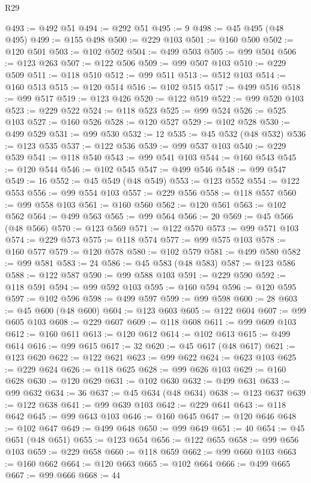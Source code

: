 \begin{lexlean}{R29}
\begin{coremodule}
@493 := @492 @51
@494 := @292 @51
@495 := 9
@498 := @45 @495 (@48 @495)
@499 := @155 @498
@500 := @229 @103
@501 := @160 @500
@502 := @120 @501
@503 := @102 @502
@504 := @499 @503
@505 := @99 @504
@506 := @123 @263
@507 := @122 @506
@509 := @99 @507 @103
@510 := @229 @509
@511 := @118 @510
@512 := @99 @511
@513 := @512 @103
@514 := @160 @513
@515 := @120 @514
@516 := @102 @515
@517 := @499 @516
@518 := @99 @517
@519 := @123 @426
@520 := @122 @519
@522 := @99 @520 @103
@523 := @229 @522
@524 := @118 @523
@525 := @99 @524
@526 := @525 @103
@527 := @160 @526
@528 := @120 @527
@529 := @102 @528
@530 := @499 @529
@531 := @99 @530
@532 := 12
@535 := @45 @532 (@48 @532)
@536 := @123 @535
@537 := @122 @536
@539 := @99 @537 @103
@540 := @229 @539
@541 := @118 @540
@543 := @99 @541 @103
@544 := @160 @543
@545 := @120 @544
@546 := @102 @545
@547 := @499 @546
@548 := @99 @547
@549 := 16
@552 := @45 @549 (@48 @549)
@553 := @123 @552
@554 := @122 @553
@556 := @99 @554 @103
@557 := @229 @556
@558 := @118 @557
@560 := @99 @558 @103
@561 := @160 @560
@562 := @120 @561
@563 := @102 @562
@564 := @499 @563
@565 := @99 @564
@566 := 20
@569 := @45 @566 (@48 @566)
@570 := @123 @569
@571 := @122 @570
@573 := @99 @571 @103
@574 := @229 @573
@575 := @118 @574
@577 := @99 @575 @103
@578 := @160 @577
@579 := @120 @578
@580 := @102 @579
@581 := @499 @580
@582 := @99 @581
@583 := 24
@586 := @45 @583 (@48 @583)
@587 := @123 @586
@588 := @122 @587
@590 := @99 @588 @103
@591 := @229 @590
@592 := @118 @591
@594 := @99 @592 @103
@595 := @160 @594
@596 := @120 @595
@597 := @102 @596
@598 := @499 @597
@599 := @99 @598
@600 := 28
@603 := @45 @600 (@48 @600)
@604 := @123 @603
@605 := @122 @604
@607 := @99 @605 @103
@608 := @229 @607
@609 := @118 @608
@611 := @99 @609 @103
@612 := @160 @611
@613 := @120 @612
@614 := @102 @613
@615 := @499 @614
@616 := @99 @615
@617 := 32
@620 := @45 @617 (@48 @617)
@621 := @123 @620
@622 := @122 @621
@623 := @99 @622
@624 := @623 @103
@625 := @229 @624
@626 := @118 @625
@628 := @99 @626 @103
@629 := @160 @628
@630 := @120 @629
@631 := @102 @630
@632 := @499 @631
@633 := @99 @632
@634 := 36
@637 := @45 @634 (@48 @634)
@638 := @123 @637
@639 := @122 @638
@641 := @99 @639 @103
@642 := @229 @641
@643 := @118 @642
@645 := @99 @643 @103
@646 := @160 @645
@647 := @120 @646
@648 := @102 @647
@649 := @499 @648
@650 := @99 @649
@651 := 40
@654 := @45 @651 (@48 @651)
@655 := @123 @654
@656 := @122 @655
@658 := @99 @656 @103
@659 := @229 @658
@660 := @118 @659
@662 := @99 @660 @103
@663 := @160 @662
@664 := @120 @663
@665 := @102 @664
@666 := @499 @665
@667 := @99 @666
@668 := 44

\end{coremodule}
\end{lexlean}
